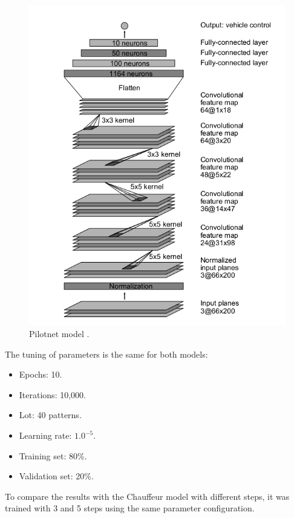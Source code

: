 \documentclass{cys}
\begin{document}
\begin{figure}[h]
	\centerline{\includegraphics[scale=0.33]{img/pilotnet}}
	\caption{Pilotnet model \cite{bojarski2016end}.}
	\label{fig:pilotnet}
\end{figure}

The tuning of parameters is the same for both models:
\begin{itemize}
	\item Epochs: 10.
	\item Iterations: 10,000.
	\item Lot: 40 patterns.
	\item Learning rate: $1.0^{-5}$.
	\item Training set: 80\%.
	\item Validation set: 20\%.
\end{itemize}

To compare the results with the Chauffeur model with different steps, it was trained with 3 and 5 steps using the same parameter configuration.


\end{document}
